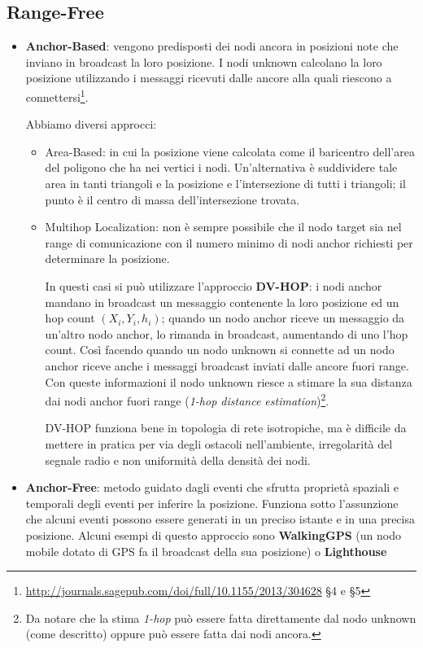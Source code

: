 \subsection{Range-Free}\label{subsubsec3.4.2}
\begin{itemize}
    \item \textbf{Anchor-Based}: vengono predisposti dei nodi ancora in posizioni note che inviano in broadcast la loro posizione. I nodi unknown calcolano la loro posizione utilizzando i messaggi ricevuti dalle ancore alla quali riescono a connettersi\footnote{\url{http://journals.sagepub.com/doi/full/10.1155/2013/304628} §4 e §5}.

    Abbiamo diversi approcci:
    \begin{itemize}
        \item Area-Based: in cui la posizione viene calcolata
        come il baricentro dell'area del poligono che ha nei vertici i nodi.
        Un'alternativa è suddividere tale area in tanti triangoli e la posizione e
        l'intersezione di tutti i triangoli; il punto è il centro di massa
        dell'intersezione trovata.
        \item Multihop Localization: non è sempre possibile che
        il nodo target sia nel range di comunicazione con il numero minimo di nodi
        anchor richiesti per determinare la posizione.

        In questi casi si può utilizzare l'approccio \textbf{DV-HOP}:
        i nodi anchor mandano in broadcast un messaggio contenente la loro posizione ed un hop count $(X_i, Y_i, h_i)$; quando un nodo anchor riceve un messaggio da un'altro nodo anchor, lo rimanda in broadcast, aumentando di uno l'hop count.
        Così facendo quando un nodo unknown si connette ad un nodo anchor riceve anche i messaggi broadcast inviati dalle ancore fuori range. Con queste informazioni il nodo unknown riesce a stimare la sua distanza dai nodi anchor fuori range (\textit{1-hop distance estimation})\footnote{Da notare che la stima \textit{1-hop} può essere fatta direttamente dal nodo unknown (come descritto) oppure può essere fatta dai nodi ancora.}.

        DV-HOP funziona bene in topologia di rete isotropiche,
        ma è difficile da mettere in pratica per via degli ostacoli nell'ambiente,
        irregolarità del segnale radio e non uniformità della densità dei nodi.
    \end{itemize}
    \item \textbf{Anchor-Free}: metodo guidato dagli eventi che sfrutta
    proprietà spaziali e temporali degli eventi per inferire la posizione.
    Funziona sotto l'assunzione che alcuni eventi possono essere generati in un preciso istante e in una precisa posizione.
    Alcuni esempi di questo approccio sono \textbf{WalkingGPS} (un nodo mobile dotato di GPS fa il broadcast della sua posizione) o \textbf{Lighthouse}
\end{itemize}


